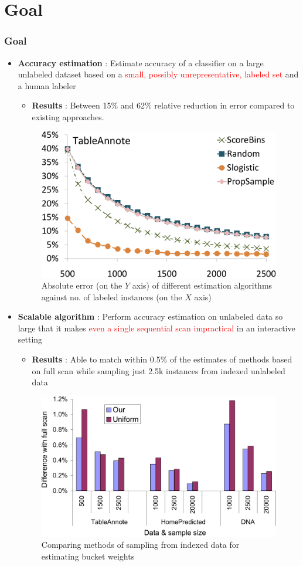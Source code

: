 \documentclass[11pt]{beamer}
\newlength{\wideitemsep}
\let\olditem\item
\renewcommand{\item}{\setlength{\itemsep}{\wideitemsep}\olditem}
\begin{document}
\section{Goal}
\begin{frame}[allowframebreaks]
\frametitle{Goal} \vspace{-5mm}
\begin{itemize}
\item \textbf{Accuracy estimation} : Estimate accuracy of a classifier on a large unlabeled dataset based on a \textcolor{red}{small, possibly unrepresentative, labeled set} and a human labeler \vspace*{1mm}
\begin{itemize}
\item \textbf{Results} : Between 15\% and 62\% relative reduction in error compared to existing approaches. 
\end{itemize}
\begin{center}
\begin{figure}
\includegraphics[width=0.5\hsize]{figs/e1tableannote_crop}
\caption{Absolute error (on the $Y$ axis) of different estimation algorithms against no. of labeled instances (on the $X$ axis)}
\end{figure}
\end{center}

\item \textbf{Scalable algorithm} : Perform accuracy estimation on unlabeled data so large that it makes \textcolor{red}{even a single sequential scan impractical} in an interactive setting
\begin{itemize}
\item \textbf{Results} : Able to match within 0.5\% of the estimates of methods based on full scan while sampling just 2.5k instances from indexed unlabeled data
\end{itemize}
\begin{figure}
\begin{center}
\includegraphics[width=0.46\hsize]{figs/allDataWts-crop}
\caption{Comparing methods of sampling from indexed data for
  estimating bucket weights}
\end{center}
\end{figure}
\end{itemize}
\end{frame}
\end{document}
